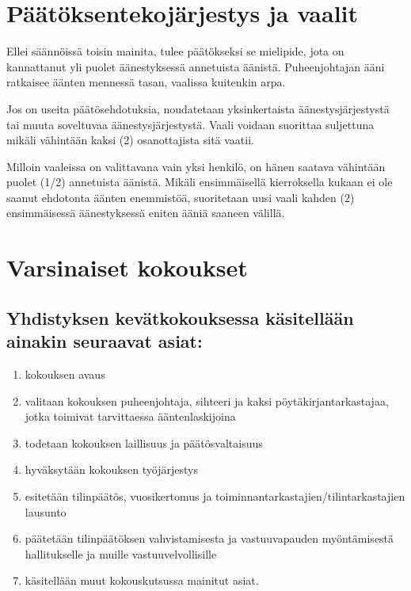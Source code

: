 \documentclass[a4paper, 12pt, finnish]{scrartcl}
\begin{document}
\section{Päätöksentekojärjestys ja vaalit}
Ellei säännöissä toisin mainita, tulee päätökseksi se mielipide, jota on kannattanut yli puolet äänestyksessä annetuista äänistä.
Puheenjohtajan ääni ratkaisee äänten mennessä tasan, vaalissa kuitenkin arpa.

Jos on useita päätösehdotuksia, noudatetaan yksinkertaista äänestysjärjestystä tai muuta soveltuvaa äänestysjärjestystä.
Vaali voidaan suorittaa suljettuna mikäli vähintään kaksi (2) osanottajista sitä vaatii.

Milloin vaaleissa on valittavana vain yksi henkilö, on hänen saatava vähintään puolet (1/2) annetuista äänistä.
Mikäli ensimmäisellä kierroksella kukaan ei ole saanut ehdotonta äänten enemmistöä, suoritetaan uusi vaali kahden (2) ensimmäisessä äänestyksessä eniten ääniä saaneen välillä.

\section{Varsinaiset kokoukset}

\subsection*{Yhdistyksen kevätkokouksessa käsitellään ainakin seuraavat asiat:}
\begin{enumerate}
  \item kokouksen avaus
  \item valitaan kokouksen puheenjohtaja, sihteeri ja kaksi pöytäkirjantarkastajaa, jotka toimivat tarvittaessa ääntenlaskijoina
  \item todetaan kokouksen laillisuus ja päätösvaltaisuus
  \item hyväksytään kokouksen työjärjestys
  \item esitetään tilinpäätös, vuosikertomus ja toiminnantarkastajien/tilintarkastajien lausunto
  \item päätetään tilinpäätöksen vahvistamisesta ja vastuuvapauden myöntämisestä hallitukselle ja muille vastuuvelvollisille
  \item käsitellään muut kokouskutsussa mainitut asiat.
\end{enumerate}
\end{document}
